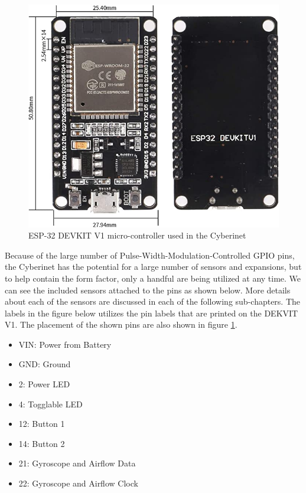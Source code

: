 \begin{center}
    \begin{figure}
        \centering
        \includegraphics[scale=0.5]{diagrams/oem/esp-32.jpg}
        \caption{ESP-32 DEVKIT V1 micro-controller used in the Cyberinet}
        \label{fig:esp-32}
    \end{figure}
\end{center}

 

Because of the large number of Pulse-Width-Modulation-Controlled GPIO pins, the Cyberinet has the potential for a large number of sensors and expansions, but to help contain the form factor, only a handful are being utilized at any time. We can see the included sensors attached to the pins as shown below. More details about each of the sensors are discussed in each of the following sub-chapters. The labels in the figure below utilizes the pin labels that are printed on the DEKVIT V1. The placement of the shown pins are also shown in figure \ref{fig:esp-32}.

\begin{itemize}
    \item VIN: Power from Battery
    \item GND: Ground
    \item 2: Power LED
    \item 4: Togglable LED
    \item 12: Button 1
    \item 14: Button 2
    \item 21: Gyroscope and Airflow Data
    \item 22: Gyroscope and Airflow Clock
\end{itemize}

